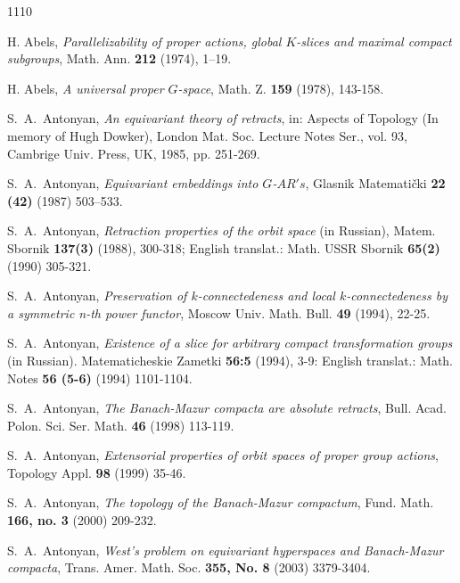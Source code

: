 \documentclass{amsart}
\begin{document}
             

\begin{thebibliography}{1110}

 H. Abels, {\em  Parallelizability of proper actions, global $K$-slices and maximal compact subgroups},  Math. Ann. {\bf  212} (1974),  1--19.

H. Abels, {\em  A universal proper $G$-space},  Math. Z. {\bf  159} (1978),  143-158.

 S.~A.~Antonyan, {\em An equivariant theory of retracts}, in: Aspects of Topology (In memory of Hugh Dowker), London Mat. Soc. Lecture Notes Ser., vol. 93, Cambrige Univ. Press, UK, 1985, pp. 251-269.

 S.~A.~Antonyan, {\em  Equivariant embeddings into $G$-$AR's$}, Glasnik Matemati\v cki {\bf 22 (42)} (1987)  503--533.

  S.~A.~Antonyan, {\em  Retraction properties of the orbit space} (in Russian), Matem. Sbornik {\bf 137(3)} (1988),  300-318; English translat.: Math. USSR Sbornik  {\bf 65(2)} (1990) 305-321.


  S.~A.~Antonyan, {\em  Preservation of $k$-connectedeness and
local  $k$-connectedeness by a symmetric n-th power functor}, Moscow Univ. Math. Bull. {\bf 49}
(1994), 22-25.

  S.~A.~Antonyan, {\em  Existence of a slice for arbitrary compact transformation groups} (in Russian).  Matematicheskie Zametki {\bf 56:5} (1994),  3-9: English translat.:  Math. Notes {\bf 56 (5-6)} (1994)  1101-1104.


 S.~A.~Antonyan, {\em  The Banach-Mazur compacta are absolute retracts}, 
 Bull. Acad. Polon. Sci. Ser. Math. {\bf  46} (1998) 113-119.

 S.~A.~Antonyan, {\em  Extensorial properties of orbit spaces of proper group actions},  Topology Appl. {\bf  98} (1999) 35-46.

 S.~A.~Antonyan, {\em  The topology of the Banach-Mazur compactum},    Fund. Math. {\bf 166, no. 3} (2000) 209-232.



 S.~A.~Antonyan, {\em West's problem on equivariant hyperspaces and Banach-Mazur compacta},   Trans. Amer. Math. Soc. {\bf 355, No. 8} (2003) 3379-3404.





\end{thebibliography}
\end{document}
